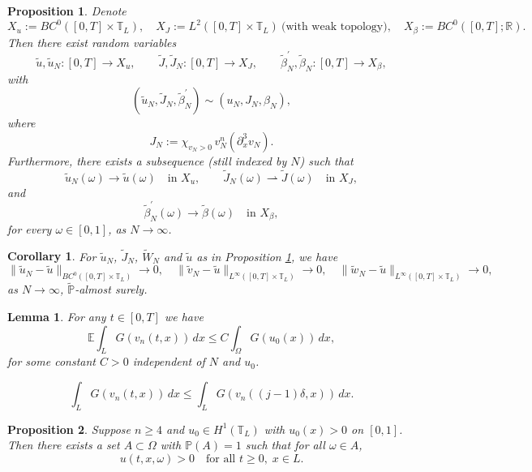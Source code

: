 \documentclass[10pt,a4paper]{amsart}
\newtheorem{lemma}{Lemma}
\newtheorem{proposition}{Proposition}
\newtheorem{corollary}{Corollary}
\def\T{\mathbb{T}_L}
\begin{document}
\begin{proposition}\label{prop:3.7}
Denote
\[
X_u := BC^0([0,T]\times \T), \quad
X_J := L^2([0,T]\times \T)\ \text{(with weak topology)}, \quad
X_\beta := BC^0([0,T];\mathbb{R}).
\]
Then there exist random variables
\[
\tilde u, \tilde u_N : [0,T] \to X_u, \qquad
\tilde J, \tilde J_N : [0,T] \to X_J, \qquad
\tilde \beta_N^{'}, \tilde \beta_N : [0,T] \to X_\beta,
\]
with
\[
(\tilde u_N, \tilde J_N, \tilde \beta_N^{'}) \sim (u_N, J_N, \beta_N),
\]
where
\[
J_N := \chi_{v_N > 0}\, v_N^n(\partial_x^3 v_N).
\]
Furthermore, there exists a subsequence (still indexed by $N$) such that
\[
\tilde u_N(\omega) \to \tilde u(\omega) \quad \text{in } X_u, \qquad
\tilde J_N(\omega) \rightharpoonup \tilde J(\omega) \quad \text{in } X_J,
\]
and
\[
\tilde \beta_N^{'}(\omega) \to \tilde \beta(\omega) \quad \text{in } X_\beta,
\]
for every $\omega \in [0,1]$, as $N \to \infty$.
\end{proposition}

\begin{corollary}\label{cor:3.8}
For $\tilde u_N$, $\tilde J_N$, $\tilde W_N$ and $\tilde u$ as in Proposition \ref{prop:3.7}, we have
\begin{equation}\label{3.19}
\|\tilde u_N - \tilde u\|_{BC^0([0,T]\times \T)} \to 0,
\quad
\|\tilde v_N - \tilde u\|_{L^\infty([0,T]\times \T)} \to 0,
\quad
\|\tilde w_N - \tilde u\|_{L^\infty([0,T]\times \T)} \to 0,
\tag{3.19}
\end{equation}
as $N \to \infty$, $\tilde{\mathbb{P}}$-almost surely.
\end{corollary}

\begin{lemma}\label{lem:4.1}
For any $t \in [0,T]$ we have
\begin{equation}
\mathbb{E} \int_L G(v_n(t,x))\, dx 
\le C \int_\Omega G(u_0(x))\, dx,
\label{4.1}
\end{equation}
for some constant $C>0$ independent of $N$ and $u_0$.
\end{lemma}

\begin{equation}
\int_L G(v_n(t,x))\, dx 
\le \int_L G(v_n((j-1)\delta,x))\, dx.
\label{4.2}
\end{equation}

\begin{proposition}\label{prop:5.1}
Suppose $n \ge 4$ and $u_0 \in H^{1}(\mathbb{T}_L)$ with
$u_0(x) > 0$ on $[0,1]$. Then there exists a set
$A \subset \Omega$ with $\mathbb{P}(A)=1$ such that
for all $\omega \in A$,
\[
u(t,x,\omega) > 0
\quad \text{for all } t \ge 0, \; x \in L.
\]
\end{proposition}
\end{document}
